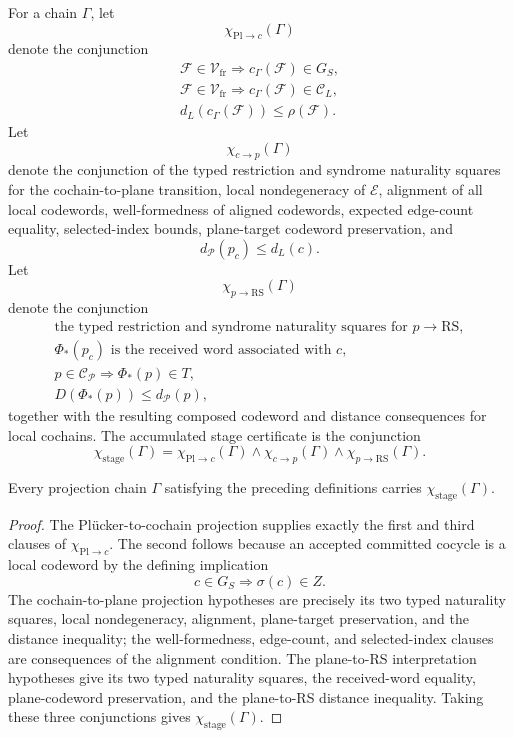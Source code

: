 \begin{definition}\label{def:stage-certificates}
For a chain \(\Gamma\), let
\[
  \chi_{\mathrm{Pl}\to c}(\Gamma)
\]
denote the conjunction
\[
\begin{gathered}
  \mathcal F\in\mathcal V_{\mathrm{fr}}
  \Rightarrow c_\Gamma(\mathcal F)\in G_S,\\
  \mathcal F\in\mathcal V_{\mathrm{fr}}
  \Rightarrow c_\Gamma(\mathcal F)\in\mathcal C_L,\\
  d_L(c_\Gamma(\mathcal F))\le \rho(\mathcal F).
\end{gathered}
\]
Let
\[
  \chi_{c\to p}(\Gamma)
\]
denote the conjunction of the typed restriction and syndrome naturality
squares for the cochain-to-plane transition, local nondegeneracy of
\(\mathcal E\), alignment of all local codewords, well-formedness of aligned
codewords, expected edge-count equality, selected-index bounds, plane-target
codeword preservation, and
\[
  d_{\mathcal P}(p_c)\le d_L(c).
\]
Let
\[
  \chi_{p\to\mathrm{RS}}(\Gamma)
\]
denote the conjunction
\[
\begin{gathered}
  \text{the typed restriction and syndrome naturality squares for }p\to\mathrm{RS},\\
  \Phi_\ast(p_c)\text{ is the received word associated with }c,\\
  p\in\mathcal C_{\mathcal P}\Rightarrow \Phi_\ast(p)\in T,\\
  D(\Phi_\ast(p))\le d_{\mathcal P}(p),
\end{gathered}
\]
together with the resulting composed codeword and distance consequences for
local cochains.
The accumulated stage certificate is the conjunction
\[
  \chi_{\mathrm{stage}}(\Gamma)
  =
  \chi_{\mathrm{Pl}\to c}(\Gamma)
  \wedge \chi_{c\to p}(\Gamma)
  \wedge \chi_{p\to\mathrm{RS}}(\Gamma).
\]
\end{definition}

\begin{proposition}\label{prop:stage-certificate-exists}
Every projection chain \(\Gamma\) satisfying the preceding definitions carries
\(\chi_{\mathrm{stage}}(\Gamma)\).
\end{proposition}

\begin{proof}
The Pl\"ucker-to-cochain projection supplies exactly the first and third clauses
of \(\chi_{\mathrm{Pl}\to c}\). The second follows because an accepted
committed cocycle is a local codeword by the defining implication
\[
  c\in G_S\Rightarrow \sigma(c)\in Z.
\]
The cochain-to-plane projection hypotheses are precisely its two typed
naturality squares, local nondegeneracy, alignment, plane-target preservation,
and the distance inequality; the well-formedness, edge-count, and
selected-index clauses are consequences of the alignment condition. The
plane-to-RS interpretation hypotheses give its two typed naturality squares,
the received-word equality, plane-codeword preservation, and the
plane-to-RS distance inequality.
Taking these three conjunctions gives \(\chi_{\mathrm{stage}}(\Gamma)\).
\end{proof}

